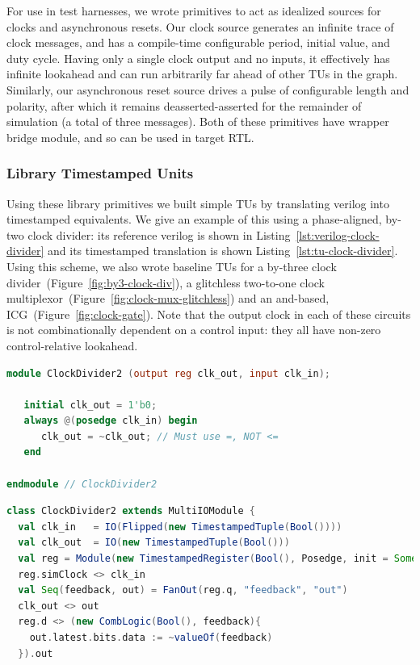 For use in test harnesses, we wrote primitives to act as idealized sources for
clocks and asynchronous resets.  Our clock source generates an infinite trace
of clock messages, and has a compile-time configurable period, initial value,
and duty cycle.  Having only a single clock output and no inputs, it
effectively has infinite lookahead and can run arbitrarily far ahead of other
TUs in the graph.  Similarly, our asynchronous reset source drives a pulse of
configurable length and polarity, after which it remains deasserted-asserted for the
remainder of simulation (a total of three messages). Both of these primitives
have wrapper bridge module, and so can be used in target RTL.

\subsubsection{Library Timestamped Units}
Using these library primitives we built simple TUs by translating verilog into
timestamped equivalents. We give an example of this using a phase-aligned,
by-two clock divider: its reference verilog is shown in
Listing~\ref{lst:verilog-clock-divider} and its timestamped translation is
shown Listing~\ref{lst:tu-clock-divider}. Using this scheme, we also wrote baseline
TUs for a by-three clock divider~(Figure~\ref{fig:by3-clock-div}), a glitchless
two-to-one clock multiplexor~(Figure~\ref{fig:clock-mux-glitchless}) and an
and-based, ICG~(Figure~\ref{fig:clock-gate}).  Note that the output clock in
each of these circuits is not combinationally dependent on a control input:
they all have non-zero control-relative lookahead.

\begin{lstlisting}[language=Verilog, style=verilogStyle, float,
label={lst:verilog-clock-divider}, caption=A reference phase-aligned clock-divider from Rocket Chip used in RTL simulation.]
module ClockDivider2 (output reg clk_out, input clk_in);

   initial clk_out = 1'b0;
   always @(posedge clk_in) begin
      clk_out = ~clk_out; // Must use =, NOT <=
   end

endmodule // ClockDivider2
\end{lstlisting}

\begin{lstlisting}[language=Scala, style=scalaStyle, float, label={lst:tu-clock-divider}, caption=The equivalent TU for the clock divider shown in Listing~\ref{lst:verilog-clock-divider} implemented using library primitives.]
class ClockDivider2 extends MultiIOModule {
  val clk_in   = IO(Flipped(new TimestampedTuple(Bool())))
  val clk_out  = IO(new TimestampedTuple(Bool()))
  val reg = Module(new TimestampedRegister(Bool(), Posedge, init = Some(false.B)))
  reg.simClock <> clk_in
  val Seq(feedback, out) = FanOut(reg.q, "feedback", "out")
  clk_out <> out
  reg.d <> (new CombLogic(Bool(), feedback){
    out.latest.bits.data := ~valueOf(feedback)
  }).out
\end{lstlisting}

